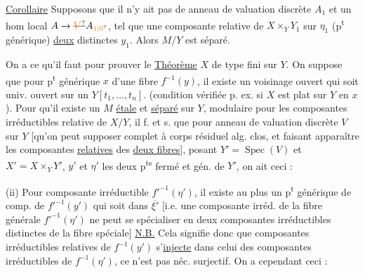 \uline{Corollaire}  Supposons que il n'y ait pas de \unsure{!}  anneau de valuation discrète $A_1$ et un hom local $A\to\deleted{\unsure{V}}A_{\unsure{1|0}}$, tel que une composante relative de $X\times_Y Y_1$ sur $\eta_1$ (p\textsuperscript{t} générique)   \uline{deux} distinctes  $y_1$. Alors $M/Y$ est séparé.

On a   ce qu'il faut pour prouver le
\uline{Théorème} $X$  de type fini sur $Y$. On suppose que  pour  p\textsuperscript{t} générique $x$ d'une  fibre $f^{-1}(y)$, il existe un voisinage ouvert qui soit univ. ouvert  sur un $Y[t_1,\ldots,t_n]$. (condition vérifiée p. ex. si $X$ est plat sur $Y$ en   $x$). Pour qu'il existe un $M$ \uline{étale} et \uline{séparé} sur $Y$,  modulaire pour les composantes irréductibles relative de $X/Y$, il f. et s. que pour  anneau de valuation discrète $V$ sur $Y$ [qu'on peut supposer complet à corps résiduel alg. clos, et  faisant apparaître les composantes  \uline{relatives} des \uline{deux fibres}], posant $Y'=\operatorname{Spec}(V)$ et $X'=X\times_Y Y'$, $y'$ et $\eta'$ les deux p\textsuperscript{ts} fermé et gén. de $Y'$, on ait ceci :


(ii) Pour   composante irréductible   $ {f'}^{-1}(\eta')$, il existe au plus un p\textsuperscript{t} générique de comp. de $ {f'}^{-1}(y')$ qui soit dans $\overline{\xi'}$ [i.e. une composante irréd. de la fibre générale $ {f'}^{-1}(\eta')$ ne peut se spécialiser en deux composantes irréductibles distinctes de la fibre spéciale]
\uline{N.B.} Cela signifie donc que   composantes irréductibles relatives de $f^{-1}(y')$  s'\uline{injecte} dans celui des composantes irréductibles   de $f^{-1}(\eta')$, ce n'est pas néc. surjectif. On a cependant ceci :

